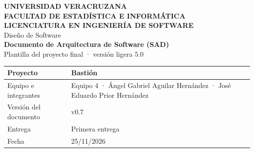 \documentclass[11pt,letterpaper]{article}
\begin{document}
\thispagestyle{plain}
\begin{center}
  {\bfseries\large UNIVERSIDAD VERACRUZANA\\[2pt]
  FACULTAD DE ESTADÍSTICA E INFORMÁTICA\\[2pt]
  LICENCIATURA EN INGENIERÍA DE SOFTWARE}\\[2pt]
  {\color{SADGray}\large Diseño de Software}\\[2.2em]
  {\bfseries\fontsize{22}{26}\selectfont\color{SADBlue} Documento de Arquitectura de Software (SAD)}\\[0.8em]
  {\large\color{SADBlue} Plantilla del proyecto final · versión ligera 5.0}
\end{center}

\vspace{1.2em}
\noindent\begin{tabularx}{\linewidth}{|L|Y|}\hline
  Proyecto & Bastión \\\hline
  Equipo e integrantes & Equipo 4 · Ángel Gabriel Aguilar Hernández · José Eduardo Prior Hernández\\\hline
  Versión del documento & v0.7\\\hline
  Entrega & Primera entrega\\\hline
  Fecha & 25/11/2026\\\hline
\end{tabularx}
\end{document}
